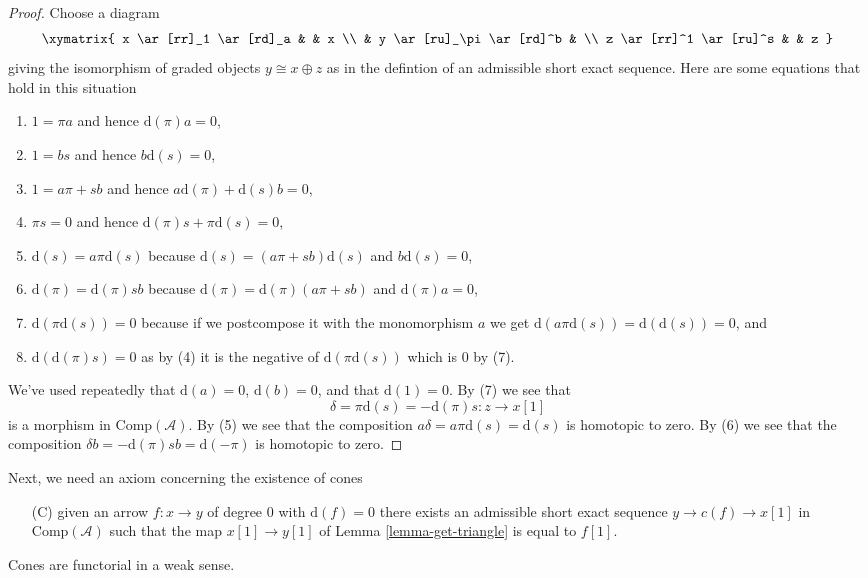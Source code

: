 \begin{proof}
Choose a diagram
$$
\xymatrix{
x \ar[rr]_1 \ar[rd]_a & & x \\
& y \ar[ru]_\pi \ar[rd]^b & \\
z \ar[rr]^1 \ar[ru]^s & & z
}
$$
giving the isomorphism of graded objects $y \cong x \oplus z$ as in the
defintion of an admissible short exact sequence. Here are some equations
that hold in this situation
\begin{enumerate}
\item $1 = \pi a$ and hence $\text{d}(\pi) a = 0$,
\item $1 = b s$ and hence $b \text{d}(s) = 0$,
\item $1 = a \pi + s b$ and hence $a \text{d}(\pi) + \text{d}(s) b = 0$,
\item $\pi s = 0$ and hence $\text{d}(\pi)s + \pi \text{d}(s) = 0$,
\item $\text{d}(s) = a \pi \text{d}(s)$ because
$\text{d}(s) = (a \pi + s b)\text{d}(s)$ and $b\text{d}(s) = 0$,
\item $\text{d}(\pi) = \text{d}(\pi) s b$ because
$\text{d}(\pi) = \text{d}(\pi)(a \pi + s b)$ and $\text{d}(\pi)a = 0$,
\item $\text{d}(\pi \text{d}(s)) = 0$ because if we postcompose it
with the monomorphism $a$ we get
$\text{d}(a\pi \text{d}(s)) = \text{d}(\text{d}(s)) = 0$, and
\item $\text{d}(\text{d}(\pi)s) = 0$ as by (4) it is the negative
of $\text{d}(\pi\text{d}(s))$ which is $0$ by (7).
\end{enumerate}
We've used repeatedly that $\text{d}(a) = 0$, $\text{d}(b) = 0$,
and that $\text{d}(1) = 0$. By (7) we see that
$$
\delta = \pi \text{d}(s) = - \text{d}(\pi) s : z \to x[1]
$$
is a morphism in $\text{Comp}(\mathcal{A})$. By (5) we see that
the composition $a \delta = a \pi \text{d}(s) = \text{d}(s)$
is homotopic to zero. By (6) we see that the composition
$\delta b = - \text{d}(\pi)sb = \text{d}(-\pi)$ is homotopic to zero.
\end{proof}

\noindent
Next, we need an axiom concerning the existence of cones
\begin{enumerate}
\item[(C)] given an arrow $f : x \to y$ of degree $0$ with
$\text{d}(f) = 0$ there exists an admissible short exact sequence
$y \to c(f) \to x[1]$ in $\text{Comp}(\mathcal{A})$ such that the map
$x[1] \to y[1]$ of Lemma \ref{lemma-get-triangle} is equal to $f[1]$.
\end{enumerate}
Cones are functorial in a weak sense.

